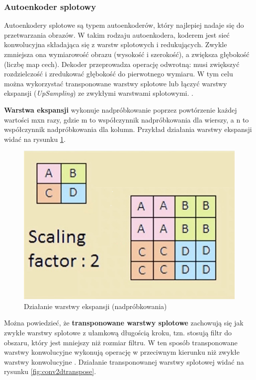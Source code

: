 \documentclass[12pt]{mwbk}
\theoremstyle{plain}
\theoremstyle{definition}
\theoremstyle{remark}
\newcommand\zrodlo[1]{\par\vspace{-3mm}{\small\textit{Źródło: }#1 }}
\begin{document}
\newpage

\subsubsection{Autoenkoder splotowy}

Autoenkodery splotowe są typem autoenkoderów, który najlepiej nadaje się do przetwarzania obrazów. W takim rodzaju autoenkodera, koderem jest sieć konwolucyjna składająca się z warstw splotowych i redukujących. Zwykle zmniejsza ona wymiarowość obrazu (wysokość i szerokość), a zwiększa głębokość (liczbę map cech). Dekoder przeprowadza operację odwrotną: musi zwiększyć rozdzielczość i zredukować głębokość do pierwotnego wymiaru. W tym celu można wykorzystać transponowane warstwy splotowe lub łączyć warstwy ekspansji (\emph{UpSampling}) ze zwykłymi warstwami splotowymi. \cite{geron}.

\textbf{Warstwa ekspansji} wykonuje nadpróbkowanie poprzez powtórzenie każdej wartości mxn razy, gdzie m to współczynnik nadpróbkowania dla wierszy, a n to współczynnik nadpróbkowania dla kolumn. Przykład działania warstwy ekspansji widać na rysunku \ref{fig:upsampling2d}.

\begin{figure}[!h]
	\centering
	\includegraphics[width=0.7\linewidth]{rys/upsampling2d.png}
	\caption{Działanie warstwy ekspansji (nadpróbkowania)}
	\zrodlo{\cite{upsampling}}
	\label{fig:upsampling2d}
\end{figure}

Można powiedzieć, że \textbf{transponowane warstwy splotowe} zachowują się jak zwykłe warstwy splotowe z ułamkową długością kroku, tzn. stosują filtr do obszaru, który jest mniejszy niż rozmiar filtru. W ten sposób transponowane warstwy konwolucyjne wykonują operację w przeciwnym kierunku niż zwykłe warstwy konwolucyjne \cite{mishra}. Działanie transponowanej warstwy splotowej widać na rysunku \ref{fig:conv2dtranspose}. 
\end{document}
